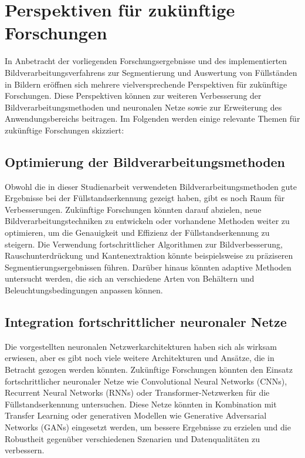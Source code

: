 \section{Perspektiven für zukünftige Forschungen}

In Anbetracht der vorliegenden Forschungsergebnisse und des implementierten Bildverarbeitungsverfahrens zur Segmentierung und Auswertung von Füllständen in Bildern eröffnen sich mehrere vielversprechende Perspektiven für zukünftige Forschungen. Diese Perspektiven können zur weiteren Verbesserung der Bildverarbeitungsmethoden und neuronalen Netze sowie zur Erweiterung des Anwendungsbereichs beitragen. Im Folgenden werden einige relevante Themen für zukünftige Forschungen skizziert:

\subsection{Optimierung der Bildverarbeitungsmethoden}

Obwohl die in dieser Studienarbeit verwendeten Bildverarbeitungsmethoden gute Ergebnisse bei der Füllstandserkennung gezeigt haben, gibt es noch Raum für Verbesserungen. Zukünftige Forschungen könnten darauf abzielen, neue Bildverarbeitungstechniken zu entwickeln oder vorhandene Methoden weiter zu optimieren, um die Genauigkeit und Effizienz der Füllstandserkennung zu steigern. Die Verwendung fortschrittlicher Algorithmen zur Bildverbesserung, Rauschunterdrückung und Kantenextraktion könnte beispielsweise zu präziseren Segmentierungsergebnissen führen. Darüber hinaus könnten adaptive Methoden untersucht werden, die sich an verschiedene Arten von Behältern und Beleuchtungsbedingungen anpassen können.

\subsection{Integration fortschrittlicher neuronaler Netze}

Die vorgestellten neuronalen Netzwerkarchitekturen haben sich als wirksam erwiesen, aber es gibt noch viele weitere Architekturen und Ansätze, die in Betracht gezogen werden könnten. Zukünftige Forschungen könnten den Einsatz fortschrittlicher neuronaler Netze wie Convolutional Neural Networks (CNNs), Recurrent Neural Networks (RNNs) oder Transformer-Netzwerken für die Füllstandserkennung untersuchen. Diese Netze könnten in Kombination mit Transfer Learning oder generativen Modellen wie Generative Adversarial Networks (GANs) eingesetzt werden, um bessere Ergebnisse zu erzielen und die Robustheit gegenüber verschiedenen Szenarien und Datenqualitäten zu verbessern.


